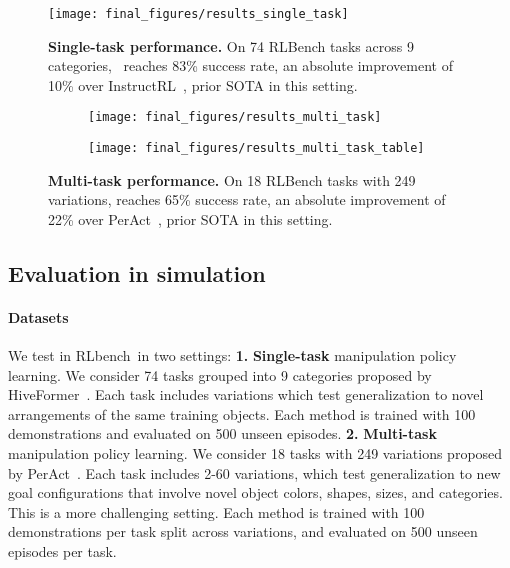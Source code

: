 \begin{figure}[t!]
\begin{adjustbox}{center}
    \texttt{[image: final\_figures/results\_single\_task]}
    \end{adjustbox}
    \caption{\textbf{Single-task performance.} On 74 RLBench tasks across 9 categories, \model{}~reaches 83\% success rate, an absolute improvement of 10\% over InstructRL~\cite{liu2022instruction}, prior SOTA in this setting.}
    \label{fig:results_single_task}
\vspace{0.5cm}
     \begin{adjustbox}{center}
     \begin{subfigure}[c]{0.35\textwidth}
         \texttt{[image: final\_figures/results\_multi\_task]}
     \end{subfigure}
     \hspace{-60pt}
     \begin{subfigure}[c]{0.8\textwidth}
         \texttt{[image: final\_figures/results\_multi\_task\_table]}
     \end{subfigure}
    \end{adjustbox}
     \caption{\textbf{Multi-task performance.} On 18 RLBench tasks with 249 variations, \model{} reaches 65\% success rate, an absolute improvement of 22\% over PerAct~\cite{shridhar2023perceiver}, prior SOTA in this setting.}
     \label{fig:multi_task_results}
\end{figure}
\subsection{Evaluation in simulation}


\paragraph{Datasets}  We test \model{} in RLbench~in two settings: \textbf{1.} \textbf{Single-task} manipulation policy learning. We consider 74 tasks grouped into 9 categories proposed by HiveFormer~\cite{guhur2023instruction}. Each task includes   variations which test generalization  
to novel arrangements of the same training objects.
Each method is trained with 100 demonstrations and evaluated on 500 unseen episodes.  \textbf{2.}  \textbf{Multi-task} manipulation policy learning. We consider 18 tasks with 249 variations proposed by PerAct~\cite{shridhar2023perceiver}.
Each task includes  2-60 variations, which test generalization  to new goal configurations that involve  novel object colors, shapes, sizes, and categories. This is a more challenging setting. Each method is trained with 100 demonstrations per task split across variations, and evaluated on 500 unseen episodes per task.


